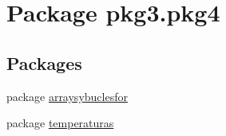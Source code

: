 \hypertarget{namespacepkg3_1_1pkg4}{}\section{Package pkg3.\+pkg4}
\label{namespacepkg3_1_1pkg4}
\subsection*{Packages}
\begin{DoxyCompactItemize}
\item 
package \mbox{\hyperlink{namespacepkg3_1_1pkg4_1_1arraysybuclesfor}{arraysybuclesfor}}
\item 
package \mbox{\hyperlink{namespacepkg3_1_1pkg4_1_1temperaturas}{temperaturas}}
\end{DoxyCompactItemize}
